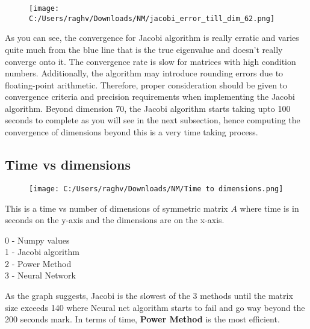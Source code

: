 \documentclass{article}
\begin{document}
\begin{figure}[h]
    \centering
    \texttt{[image: C:/Users/raghv/Downloads/NM/jacobi\_error\_till\_dim\_62.png]}
    \label{fig:image2}
\end{figure}

As you can see, the convergence for Jacobi algorithm is really erratic and varies quite much from the blue line that is the true eigenvalue and doesn't really converge onto it. 
The convergence rate is slow for matrices with high condition numbers. Additionally, the algorithm may introduce rounding errors due to floating-point arithmetic. Therefore, proper consideration should be given to convergence criteria and precision requirements when implementing the Jacobi algorithm. Beyond dimension 70, the Jacobi algorithm starts taking upto 100 seconds to complete as you will see in the next subsection, hence computing the convergence of dimensions beyond this is a very time taking process.

\subsection{Time vs dimensions}

\begin{figure}[h]
    \centering
    \texttt{[image: C:/Users/raghv/Downloads/NM/Time to dimensions.png]}
    \label{fig:image2}
\end{figure}

This is a time vs number of dimensions of symmetric matrix $A$ where time is in seconds on the y-axis and the dimensions are on the x-axis.
    \\
    \begin{center}
        0 - Numpy values \\
        1 - Jacobi algorithm \\
        2 - Power Method \\
        3 - Neural Network \\
    \end{center}

    As the graph suggests, Jacobi is the slowest of the 3 methods until the matrix size exceeds 140 where Neural net algorithm starts to fail and go way beyond the 200 seconds mark. In terms of time, \large \textbf{Power Method} \normalsize is the most efficient.
\end{document}
